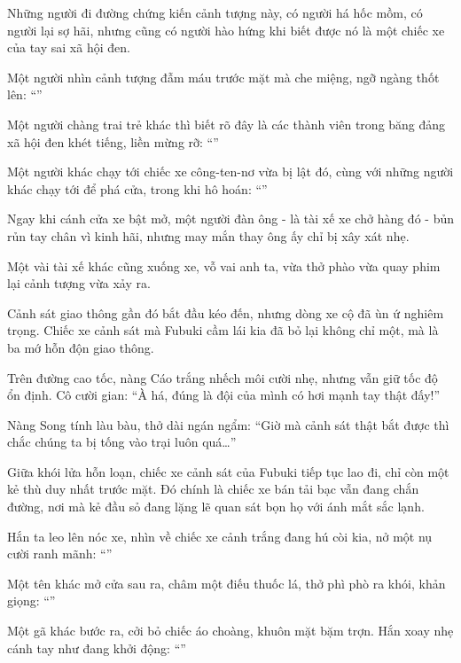 \documentclass[../main.tex]{subfiles}
\begin{document}
Những người đi đường chứng kiến cảnh tượng này, có người há hốc mồm, có người lại sợ hãi, nhưng cũng có người hào hứng khi biết được nó là một chiếc xe của tay sai xã hội đen.

Một người nhìn cảnh tượng đẫm máu trước mặt mà che miệng, ngỡ ngàng thốt lên: ``''

Một người chàng trai trẻ khác thì biết rõ đây là các thành viên trong băng đảng xã hội đen khét tiếng, liền mừng rỡ: ``''

Một người khác chạy tới chiếc xe công-ten-nơ vừa bị lật đó, cùng với những người khác chạy tới để phá cửa, trong khi hô hoán: ``''

Ngay khi cánh cửa xe bật mở, một người đàn ông - là tài xế xe chở hàng đó - bủn rủn tay chân vì kinh hãi, nhưng may mắn thay ông ấy chỉ bị xây xát nhẹ.

Một vài tài xế khác cũng xuống xe, vỗ vai anh ta, vừa thở phào vừa quay phim lại cảnh tượng vừa xảy ra.

Cảnh sát giao thông gần đó bắt đầu kéo đến, nhưng dòng xe cộ đã ùn ứ nghiêm trọng. Chiếc xe cảnh sát mà Fubuki cầm lái kia đã bỏ lại không chỉ một, mà là ba mớ hỗn độn giao thông.

Trên đường cao tốc, nàng Cáo trắng nhếch môi cười nhẹ, nhưng vẫn giữ tốc độ ổn định. Cô cười gian: ``À há, đúng là đội của mình có hơi mạnh tay thật đấy!''

Nàng Song tính làu bàu, thở dài ngán ngẩm: ``Giờ mà cảnh sát thật bắt được thì chắc chúng ta bị tống vào trại luôn quá\dots''

Giữa khói lửa hỗn loạn, chiếc xe cảnh sát của Fubuki tiếp tục lao đi, chỉ còn một kẻ thù duy nhất trước mặt. Đó chính là chiếc xe bán tải bạc vẫn đang chắn đường, nơi mà kẻ đầu sỏ đang lặng lẽ quan sát bọn họ với ánh mắt sắc lạnh.

Hắn ta leo lên nóc xe, nhìn về chiếc xe cảnh trắng đang hú còi kia, nở một nụ cười ranh mãnh: ``''

Một tên khác mở cửa sau ra, châm một điếu thuốc lá, thở phì phò ra khói, khản giọng: ``''

Một gã khác bước ra, cởi bỏ chiếc áo choàng, khuôn mặt bặm trợn. Hắn xoay nhẹ cánh tay như đang khởi động: ``''
\end{document}
